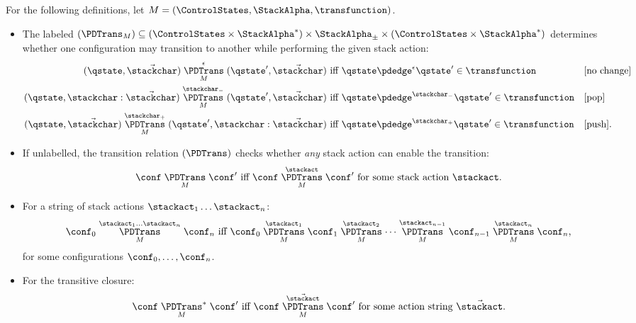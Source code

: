   \noindent
  For the following definitions, let $M = (\ControlStates,\StackAlpha,\transfunction)$.
  \begin{itemize}



  \item The labeled  $(\PDTrans_{M}) \subseteq
  (\ControlStates \times \StackAlpha^*) \times 
  \StackAlpha_\pm \times 
  (\ControlStates \times \StackAlpha^*)$
  determines whether one configuration may transition to another while performing the given stack action:
        \begin{align*}
(\qstate, \vec{\stackchar}) 
  \mathrel{\overset{\epsilon}{\underset{M}{\PDTrans}}}
  (\qstate',\vec{\stackchar}) 
  & \text{ iff }
\qstate \pdedge^\epsilon \qstate'
  \in \transfunction
  && \text{[no change]}
  \\
    (\qstate, \stackchar : \vec{\stackchar}) 
    \mathrel{\overset{\stackchar_{-}}{\underset{M}{\PDTrans}}}
    (\qstate',\vec{\stackchar})
    & \text{ iff }
\qstate \pdedge^{\stackchar_{-}} \qstate'
    \in \transfunction
    && \text{[pop]}
    \\
      (\qstate, \vec{\stackchar}) 
      \mathrel{\overset{\stackchar_{+}}{\underset{M}{\PDTrans}}}
      (\qstate',\stackchar : \vec{\stackchar}) 
      & \text{ iff }
\qstate \pdedge^{\stackchar_{+}} \qstate'
      \in \transfunction
      && \text{[push]}
      \text.
      \end{align*}


\item If unlabelled, the transition relation $(\PDTrans)$ checks whether \emph{any} stack action can enable the transition:
\begin{align*}
\conf \mathrel{\underset{M}{\PDTrans}} \conf' \text{ iff }
\conf \mathrel{\overset{\stackact}{\underset{M}{\PDTrans}}} \conf' \text{ for some stack action } \stackact 
\text.
\end{align*}

\item

For a string of stack actions $\stackact_1 \ldots
\stackact_n$:
\begin{equation*}
\conf_0 \mathrel{\overset{\stackact_1\ldots\stackact_n}{\underset{M}{\PDTrans}}} \conf_n
\text{ iff }
\conf_0
\mathrel{\overset{\stackact_1}{\underset{M}{\PDTrans}}}
\conf_1
\mathrel{\overset{\stackact_2}{\underset{M}{\PDTrans}}}
 \cdots
\mathrel{\overset{\stackact_{n-1}}{\underset{M}{\PDTrans}}}
\conf_{n-1} 
\mathrel{\overset{\stackact_n}{\underset{M}{\PDTrans}}}
\conf_n\text,
\end{equation*}
for some configurations $\conf_0,\ldots,\conf_n$.

\item

For the transitive closure:
\begin{equation*}
  \conf \mathrel{\underset{M}{\PDTrans}^{*}} \conf'
  \text{ iff }
  \conf \mathrel{\overset{\vec{\stackact}}{\underset{M}{\PDTrans}}} \conf'
   \text{ for some action string }
   \vec{\stackact}
 \text.
\end{equation*}

\end{itemize}



